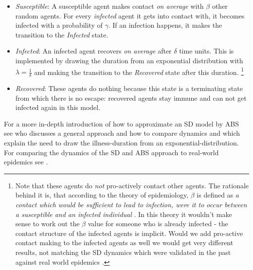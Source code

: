 \begin{itemize}
	\item \textit{Susceptible}: A susceptible agent makes contact \textit{on average} with $\beta$ other random agents. For every \textit{infected} agent it gets into contact with, it becomes infected with a probability of $\gamma$. If an infection happens, it makes the transition to the \textit{Infected} state.

	\item \textit{Infected}: An infected agent recovers \textit{on average} after $\delta$ time units. This is implemented by drawing the duration from an exponential distribution \cite{borshchev_system_2004} with $\lambda = \frac{1}{\delta}$ and making the transition to the \textit{Recovered} state after this duration.
\footnote{Note that these agents do \textit{not} pro-actively contact other agents. The rationale behind it is, that according to the theory of epidemiology, $\beta$ is defined as \textit{a contact which would be sufficient to lead to infection, were it to occur between a susceptible and an infected individual} \cite{abbey_examination_1952}. In this theory it wouldn't make sense to work out the $\beta$ value for someone who is already infected - the contact structure of the infected agents is implicit. Would we add pro-active contact making to the infected agents as well we would get very different results, not matching the SD dynamics which were validated in the past against real world epidemics \cite{ahmed_variance_2013}.}

	\item \textit{Recovered}: These agents do nothing because this state is a terminating state from which there is no escape: recovered agents stay immune and can not get infected again in this model. %
\end{itemize}

For a more in-depth introduction of how to approximate an SD model by ABS see \cite{macal_agent-based_2010} who discusses a general approach and how to compare dynamics and \cite{borshchev_system_2004} which explain the need to draw the illness-duration from an exponential-distribution. For comparing the dynamics of the SD and ABS approach to real-world epidemics see \cite{ahmed_variance_2013}.